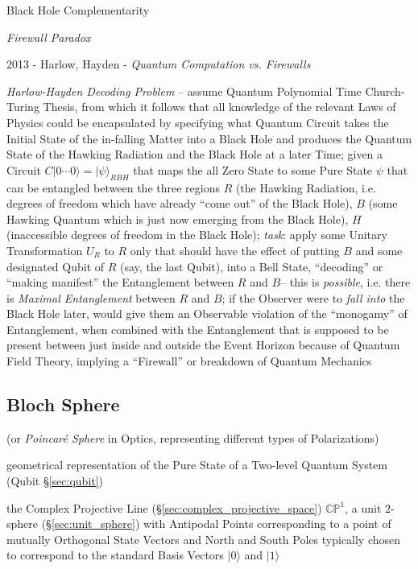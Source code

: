 Black Hole Complementarity

\emph{Firewall Paradox}

2013 - Harlow, Hayden - \emph{Quantum Computation vs. Firewalls}

\emph{Harlow-Hayden Decoding Problem} -- assume Quantum Polynomial Time
Church-Turing Thesis, from which it follows that all knowledge of the relevant
Laws of Physics could be encapsulated by specifying what Quantum Circuit takes
the Initial State of the in-falling Matter into a Black Hole and produces the
Quantum State of the Hawking Radiation and the Black Hole at a later Time; given
a Circuit $C|0 \cdots 0\rangle = |\psi\rangle_{RBH}$ that maps the all Zero
State to some Pure State $\psi$ that can be entangled between the three regions
$R$ (the Hawking Radiation, i.e. degrees of freedom which have already ``come
out'' of the Black Hole), $B$ (some Hawking Quantum which is just now emerging
from the Black Hole), $H$ (inaccessible degrees of freedom in the Black Hole);
\emph{task}: apply some Unitary Transformation $U_R$ to $R$ only that should
have the effect of putting $B$ and some designated Qubit of $R$ (say, the last
Qubit), into a Bell State, ``decoding'' or ``making manifest'' the Entanglement
between $R$ and $B$-- this is \emph{possible}, i.e. there is \emph{Maximal
  Entanglement} between $R$ and $B$; if the Observer were to \emph{fall into}
the Black Hole later, would give them an Observable violation of the
``monogamy'' of Entanglement, when combined with the Entanglement that is
supposed to be present between just inside and outside the Event Horizon because
of Quantum Field Theory, implying a ``Firewall'' or breakdown of Quantum
Mechanics



\subsection{Bloch Sphere}\label{sec:bloch_sphere}

(or \emph{Poincar\'e Sphere} in Optics, representing different types of
Polarizations)

geometrical representation of the Pure State of a Two-level Quantum System
(Qubit \S\ref{sec:qubit})

the Complex Projective Line (\S\ref{sec:complex_projective_space})
$\mathbb{CP}^1$, a unit $2$-sphere (\S\ref{sec:unit_sphere}) with Antipodal
Points corresponding to a point of mutually Orthogonal State Vectors and North
and South Poles typically chosen to correspond to the standard Basis Vectors
$|0\rangle$ and $|1\rangle$

